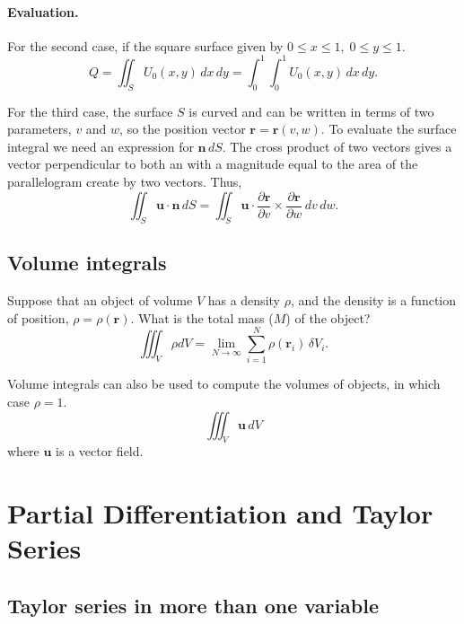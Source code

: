\paragraph{Evaluation. }
For the second case, if  the square surface given by 
$0 \leq x \leq 1, \; 0 \leq y \leq 1$.
\begin{equation}
    Q = \iint_S U_0(x,y) \, dx\,dy 
      = \int^1_0 \int^1_0 U_0(x,y) \, dx\,dy.
\end{equation}

For the third case, the surface $S$ is curved and can be written in terms of two parameters, $v$ and $w$, so the position vector $\bm{r} = \bm{r}(v,w)$. 
To evaluate the surface integral we need an expression for $\bm{n} \, dS$. 
The cross product of two vectors gives a vector perpendicular to both an with a magnitude equal to the area of the parallelogram create by two vectors. 
Thus, 
\begin{equation}
    \iint_S \bm{u} \cdot \bm{n} \, dS
    = \iint_S \bm{u} \cdot 
    \frac{\partial \bm{r}}{\partial v} \times \frac{\partial \bm{r}}{\partial w} \, dv \, dw.
\end{equation}

\subsection{Volume integrals}
\begin{example}
    Suppose that an object of volume $V$ has a density $\rho$, and the density is a function of position, $\rho = \rho (\bm{r})$.
    What is the total mass ($M$) of the object?
    \begin{equation}
        \iiint_V \rho dV 
        = \lim_{N\to \infty} \sum^N_{i=1} \rho(\bm{r}_i)\,\delta V_i.
    \end{equation}

    Volume integrals can also be used to compute the volumes of objects, in which case $\rho =1$.
    \begin{equation}
        \iiint_V \bm{u} \, dV
    \end{equation}
    where $\bm{u}$ is a vector field.
\end{example}

\section{Partial Differentiation and Taylor Series}
\subsection{Taylor series in more than one variable}
